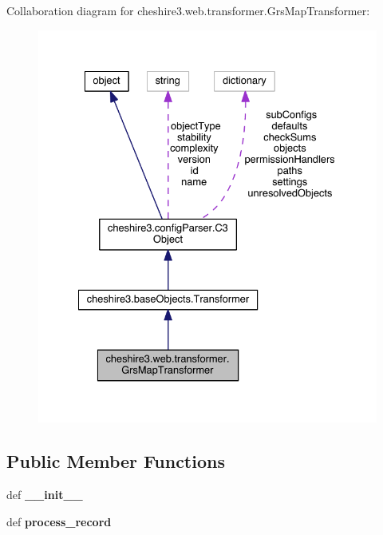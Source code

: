 Collaboration diagram for cheshire3.\-web.\-transformer.\-Grs\-Map\-Transformer\-:
\nopagebreak
\begin{figure}[H]
\begin{center}
\leavevmode
\includegraphics[width=331pt]{classcheshire3_1_1web_1_1transformer_1_1_grs_map_transformer__coll__graph}
\end{center}
\end{figure}
\subsection*{Public Member Functions}
\begin{DoxyCompactItemize}
\item 
\hypertarget{classcheshire3_1_1web_1_1transformer_1_1_grs_map_transformer_a9651f708957ba6f8fd884d983ae1127e}{def {\bfseries \-\_\-\-\_\-init\-\_\-\-\_\-}}\label{classcheshire3_1_1web_1_1transformer_1_1_grs_map_transformer_a9651f708957ba6f8fd884d983ae1127e}

\item 
\hypertarget{classcheshire3_1_1web_1_1transformer_1_1_grs_map_transformer_a7120e0bce14e8812eed4b26b45b94e14}{def {\bfseries process\-\_\-record}}\label{classcheshire3_1_1web_1_1transformer_1_1_grs_map_transformer_a7120e0bce14e8812eed4b26b45b94e14}

\end{DoxyCompactItemize}
